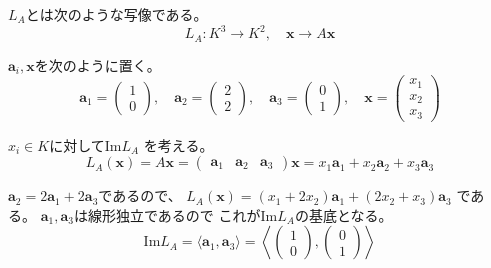 \documentclass[12pt,b5paper]{ltjsarticle}
\begin{document}
\begin{enumerate}
\begin{enumerate}
             $L_A$とは次のような写像である。
             \begin{equation}
              L_A : K^3 \to K^2 ,\quad \bm{x} \to A\bm{x}
             \end{equation}

             $\bm{a}_i,\bm{x}$を次のように置く。
             \begin{equation}
              \bm{a}_1=\begin{pmatrix} 1 \\ 0 \end{pmatrix}
              ,\quad
              \bm{a}_2=\begin{pmatrix} 2 \\ 2 \end{pmatrix}
              ,\quad
              \bm{a}_3=\begin{pmatrix} 0 \\ 1 \end{pmatrix}
              ,\quad
              \bm{x}=\begin{pmatrix} x_1 \\ x_2 \\ x_3 \end{pmatrix}
             \end{equation}

             $x_i\in K$に対して$\mathrm{Im} L_A$
             を考える。
             \begin{equation}
              L_A(\bm{x})=A\bm{x}
                =\begin{pmatrix}
                 \bm{a}_1&\bm{a}_2&\bm{a}_3
                 \end{pmatrix}\bm{x}
                = x_1\bm{a}_1 + x_2\bm{a}_2 + x_3\bm{a}_3
                \label{form}
             \end{equation}

             $\bm{a}_2=2\bm{a}_1+2\bm{a}_3$であるので、
             $L_A(\bm{x})=(x_1+2x_2)\bm{a}_1+(2x_2+x_3)\bm{a}_3$
             である。
             $\bm{a}_1,\bm{a}_3$は線形独立であるので
             これが$\mathrm{Im}L_A$の基底となる。
             \begin{equation}
              \mathrm{Im}L_A
               = \langle \bm{a}_1,\bm{a}_3 \rangle
               =\left\langle
               \begin{pmatrix} 1 \\ 0 \end{pmatrix}
               ,
               \begin{pmatrix} 0 \\ 1 \end{pmatrix}
                \right\rangle
             \end{equation}


\end{enumerate}
\end{enumerate}
\end{document}
